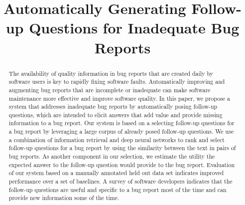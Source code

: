 \documentclass[10pt,conference]{IEEEtran}
\begin{document}
\title{Automatically Generating Follow-up Questions for Inadequate Bug Reports}

\author{
\and
{}
\and
{}
}

\maketitle

\begin{abstract}
The availability of quality information in bug reports that are created daily by software users is key
to rapidly fixing software faults.
%
%
Automatically improving and augmenting bug reports that are incomplete or
inadequate can make software maintenance more effective and improve software quality.
%
In this paper, we propose a system that addresses inadequate bug reports by automatically posing follow-up questions,
which are intended to elicit answers that add value and provide missing information to a bug report.
%
Our system is based on a selecting follow-up questions for a bug report by leveraging a large corpus of already posed follow-up questions.
%
We use a combination of information retrieval and deep neural networks to rank and select
follow-up questions for a bug report by using the similarity between the text in pairs of bug
reports.
%
As another component in our selection, we estimate the utility the expected answer to the follow-up question would provide
to the bug report.
%
Evaluation of our system based on a manually annotated held out data set indicates improved
performance over a set of baselines.
%
A survey of software developers indicates that the follow-up questions are useful and specific to a bug
report most of the time and can provide new information some of the time.

\end{abstract}
\end{document}
